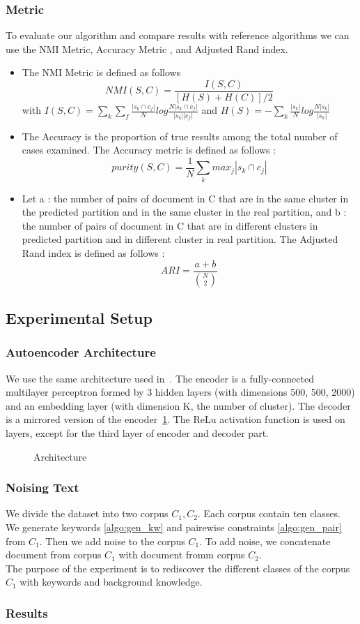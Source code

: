 \subsubsection{Metric}
To evaluate our algorithm and compare results with reference algorithms we can
use the NMI Metric\cite{measure}, Accuracy Metric \cite{measure}, and Adjusted
Rand index\cite{measure}. 
\begin{itemize}
\item The NMI Metric is defined as follows
$$NMI(S,C) = \frac{I(S,C)}{[H(S)+H(C)]/2}$$ 
with
$I(S,C) =\sum_k \sum_f\frac{|s_k \cap c_f|}{N}log\frac{N|s_k \cap c_f|}{|s_k| |c_f|}$
and
$H(S) = -\sum_k\frac{|s_k|}{N}log\frac{N|s_k|}{|s_k|}$
\item The Accuracy is the proportion of true results among the total
  number of cases examined. The Accuracy metric is defined as follows :
$$
purity(S,C) = \frac{1}{N}\sum_k {max}_j|s_k \cap c_j|
$$
\item Let a : the number of pairs of document in C
  that are in the same cluster in the predicted partition and in the
  same cluster in the real partition, and b : the number of pairs of
  document in C that are in different clusters in predicted partition
  and in different cluster in real partition.
  The Adjusted Rand index is defined as follows :
  $$ARI = \frac{a+b}{\binom{N}{2}}$$
\end{itemize}
\subsection{Experimental Setup}
\subsubsection{Autoencoder Architecture}
We use the same architecture used in~\cite{Deap-K-Means}. The encoder is a fully-connected 
multilayer perceptron formed by 3 hidden layers (with dimensions 500, 500, 2000) 
and an embedding layer (with dimension K, the number of cluster). 
The decoder is a mirrored version of the encoder~\ref{fig:archi}.
The ReLu activation function is used on layers, except for the third
layer of encoder and decoder part.  
\begin{figure}[!h]
  \centering
  
  \caption{\label{fig:archi}Architecture}
\end{figure}

\subsubsection{Noising Text}
We divide the dataset into two corpus $C_1, C_2$. Each corpus contain
ten classes. We generate keywords \ref{algo:gen_kw} and pairewise
constraints \ref{algo:gen_pair} from $C_1$. Then we add noise to the corpus
$C_1$. To add noise, we concatenate document from corpus $C_1$ with document
fromm corpus $C_2$.
\\The purpose of the experiment is to rediscover the different classes of the
corpus $C_1$ with keywords and background knowledge.

\subsubsection{Results}
